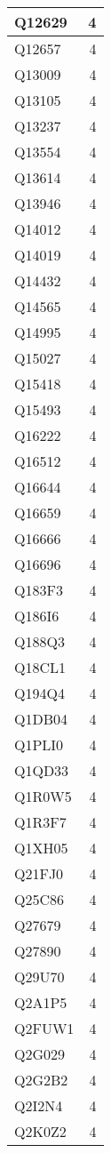 \documentclass[
]{book}
\theoremstyle{definition}
\theoremstyle{definition}
\theoremstyle{definition}
\theoremstyle{definition}
\theoremstyle{remark}
\begin{document}
\begin{table}
\begin{tabular}{l|r}
\hline
Q12629 & 4\\
\hline
Q12657 & 4\\
\hline
Q13009 & 4\\
\hline
Q13105 & 4\\
\hline
Q13237 & 4\\
\hline
Q13554 & 4\\
\hline
Q13614 & 4\\
\hline
Q13946 & 4\\
\hline
Q14012 & 4\\
\hline
Q14019 & 4\\
\hline
Q14432 & 4\\
\hline
Q14565 & 4\\
\hline
Q14995 & 4\\
\hline
Q15027 & 4\\
\hline
Q15418 & 4\\
\hline
Q15493 & 4\\
\hline
Q16222 & 4\\
\hline
Q16512 & 4\\
\hline
Q16644 & 4\\
\hline
Q16659 & 4\\
\hline
Q16666 & 4\\
\hline
Q16696 & 4\\
\hline
Q183F3 & 4\\
\hline
Q186I6 & 4\\
\hline
Q188Q3 & 4\\
\hline
Q18CL1 & 4\\
\hline
Q194Q4 & 4\\
\hline
Q1DB04 & 4\\
\hline
Q1PLI0 & 4\\
\hline
Q1QD33 & 4\\
\hline
Q1R0W5 & 4\\
\hline
Q1R3F7 & 4\\
\hline
Q1XH05 & 4\\
\hline
Q21FJ0 & 4\\
\hline
Q25C86 & 4\\
\hline
Q27679 & 4\\
\hline
Q27890 & 4\\
\hline
Q29U70 & 4\\
\hline
Q2A1P5 & 4\\
\hline
Q2FUW1 & 4\\
\hline
Q2G029 & 4\\
\hline
Q2G2B2 & 4\\
\hline
Q2I2N4 & 4\\
\hline
Q2K0Z2 & 4\\

\end{tabular}
\end{table}
\end{document}
